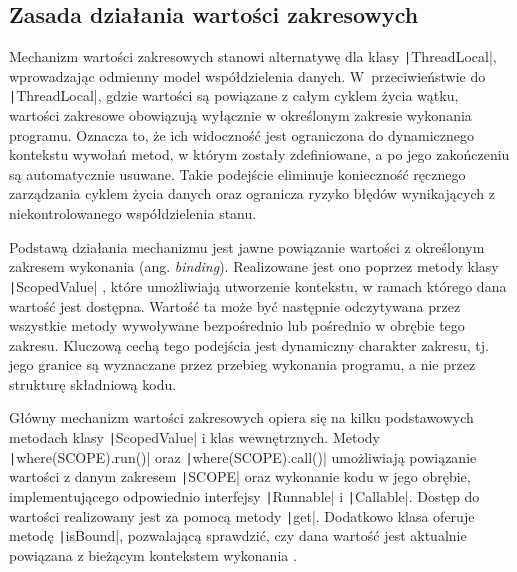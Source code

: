 \subsection{Zasada działania wartości zakresowych}
Mechanizm wartości zakresowych stanowi alternatywę dla klasy \texttt|ThreadLocal|, wprowadzając odmienny model współdzielenia danych. W~przeciwieństwie do \texttt|ThreadLocal|, gdzie wartości są powiązane z całym cyklem życia wątku, wartości zakresowe obowiązują wyłącznie w określonym zakresie wykonania programu. Oznacza to, że ich widoczność jest ograniczona do dynamicznego kontekstu wywołań metod, w którym zostały zdefiniowane, a po jego zakończeniu są automatycznie usuwane. Takie podejście eliminuje konieczność ręcznego zarządzania cyklem życia danych oraz ogranicza ryzyko błędów wynikających z niekontrolowanego współdzielenia stanu. \cite{jep506}

Podstawą działania mechanizmu jest jawne powiązanie wartości z określonym zakresem wykonania (ang. \emph{binding}). Realizowane jest ono poprzez metody klasy \texttt|ScopedValue| \cite{java-scoped-value}, które umożliwiają utworzenie kontekstu, w ramach którego dana wartość jest dostępna. Wartość ta może być następnie odczytywana przez wszystkie metody wywoływane bezpośrednio lub pośrednio w obrębie tego zakresu. Kluczową cechą tego podejścia jest dynamiczny charakter zakresu, tj. jego granice są wyznaczane przez przebieg wykonania programu, a nie przez strukturę składniową kodu. \cite{jep506,veen2024}

Główny mechanizm wartości zakresowych opiera się na kilku podstawowych metodach klasy \texttt|ScopedValue| i klas wewnętrznych. Metody \texttt|where(SCOPE).run()| oraz \texttt|where(SCOPE).call()| umożliwiają powiązanie wartości z danym zakresem \texttt|SCOPE| oraz wykonanie kodu w jego obrębie, implementującego odpowiednio interfejsy \texttt|Runnable| i \texttt|Callable|. Dostęp do wartości realizowany jest za pomocą metody \texttt|get|. Dodatkowo klasa oferuje metodę \texttt|isBound|, pozwalającą sprawdzić, czy dana wartość jest aktualnie powiązana z bieżącym kontekstem wykonania \cite{java-scoped-value}.


